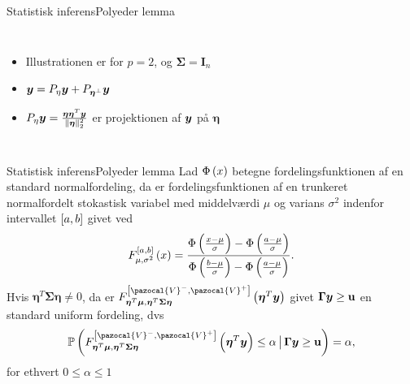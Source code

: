 \begin{frame}{Statistisk inferens}{Polyeder lemma}
\begin{columns}[c]
\column{1.5in}
\begin{itemize}
\item Illustrationen er for $p = 2$, og $\boldsymbol \Sigma = \textbf{I}_n$
\item $\bm{y} = P_{\eta} \bm{y} + P_{\boldsymbol{\eta}^\perp} \bm{y}$
\item$ P_{\eta} \bm{y} = \frac{\boldsymbol \eta \boldsymbol \eta^T\bm{y}}{\Vert \boldsymbol \eta \Vert^2_2}  $ er projektionen af $\bm{y}$ på $\boldsymbol \eta$
\end{itemize}

\column{2.2in}

 \end{columns}
% 
%
\end{frame}


\begin{frame}{Statistisk inferens}{Polyeder lemma}
Lad \(\Phi \del{x}\) betegne fordelingsfunktionen af en standard normalfordeling, da er fordelingsfunktionen af en trunkeret normalfordelt stokastisk variabel med middelværdi \(\mu\) og varians \(\sigma^2\) indenfor intervallet \(\sbr{a,b}\) givet ved
\begin{align*}
F_{\mu, \sigma^2}^{\sbr{a,b}} \del{x} = \frac{\Phi\del{\frac{x-\mu}{\sigma}} - \Phi\del{\frac{a-\mu}{\sigma}}}{\Phi\del{\frac{b-\mu}{\sigma}} - \Phi\del{\frac{a-\mu}{\sigma}}}.
\end{align*}
Hvis \(\boldsymbol{\eta}^T \boldsymbol{\Sigma} \boldsymbol{\eta} \neq 0\), da er \(F_{\boldsymbol{\eta}^T \vmu, \boldsymbol{\eta}^T \boldsymbol{\Sigma} \boldsymbol{\eta}}^{\sbr{\pazocal{V}^-,\pazocal{V}^+}} \del{\boldsymbol{\eta}^T \vy} \) givet \(\boldsymbol{\Gamma} \bm{y} \geq \mathbf{u}\) en standard uniform fordeling, dvs
\begin{align*}
\mathbb{P} \del{F_{\boldsymbol{\eta}^T \vmu, \boldsymbol{\eta}^T \boldsymbol{\Sigma} \boldsymbol{\eta}}^{\sbr{\pazocal{V}^-,\pazocal{V}^+}} \del{\boldsymbol{\eta}^T \vy} \leq \alpha \given \boldsymbol{\Gamma} \vy \geq \mathbf{u}} = \alpha, 
\end{align*}
for ethvert \(0 \leq \alpha \leq 1\)
\end{frame}

